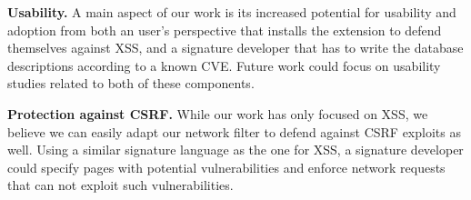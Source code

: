 \textbf{Usability.} A main aspect of our work is its increased potential for usability and adoption from both an user's perspective that installs the extension to defend themselves against XSS, and a signature developer that has to write the database descriptions according to a known CVE. Future work could focus on usability studies related to both of these components.

\textbf{Protection against CSRF.} While our work has only focused on XSS, we believe we can easily adapt our network filter to defend against CSRF exploits as well. Using a similar signature language as the one for XSS, a signature developer could specify pages with potential vulnerabilities and enforce network requests that can not exploit such vulnerabilities.

